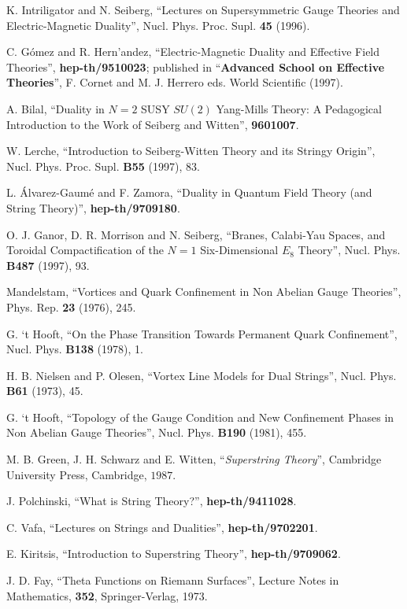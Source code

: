 \begin{thebibliography}{99}
 K. Intriligator and N. Seiberg, ``Lectures 
on Supersymmetric Gauge Theories and Electric-Magnetic Duality'', 
Nucl. Phys. Proc. Supl. {\bf 45} (1996).

 C. G\'omez and R. Hern'andez, ``Electric-Magnetic Duality 
and Effective Field Theories'', {\bf hep-th/9510023}; published
in ``{\bf Advanced School on Effective Theories}'', F. Cornet and M.
J. Herrero eds. World Scientific (1997).
  
A. Bilal, ``Duality in $N=2$ SUSY $SU(2)$ 
Yang-Mills Theory: A Pedagogical Introduction to the 
Work of Seiberg and Witten'', {\bf 9601007}.
  
W. Lerche, ``Introduction to Seiberg-Witten Theory and its Stringy
Origin'', Nucl. Phys. Proc. Supl. {\bf B55} (1997), 83.
  

L. \'Alvarez-Gaum\'e and F. Zamora, ``Duality in Quantum Field
Theory (and String Theory)'', {\bf hep-th/9709180}.

 O. J. Ganor, D. R. Morrison and N. Seiberg,
``Branes, Calabi-Yau Spaces, and Toroidal Compactification of the
$N=1$ Six-Dimensional $E_8$ Theory'', Nucl. Phys. {\bf B487}
(1997), 93.

 Mandelstam, ``Vortices and Quark Confinement 
in Non Abelian Gauge Theories'', Phys. Rep. {\bf 23} (1976), 245.

 G. `t Hooft, ``On the Phase Transition 
Towards Permanent Quark Confinement'', Nucl. Phys. {\bf B138} (1978), 1.

 H. B. Nielsen and P. Olesen, ``Vortex Line Models for 
Dual Strings'', Nucl. Phys. {\bf B61} (1973),
45.

 G. `t Hooft, ``Topology of the Gauge Condition and
New Confinement Phases in Non Abelian Gauge Theories'', Nucl. Phys. {\bf B190}
(1981), 455.

 M. B. Green, J. H. Schwarz and E. Witten,
``{\em Superstring Theory}'', Cambridge University Press,
Cambridge, $1987$.

 J. Polchinski, ``What is String Theory?'',
{\bf hep-th/9411028}.

 C. Vafa, ``Lectures on Strings and Dualities'',
{\bf hep-th/9702201}.

 E. Kiritsis, ``Introduction to Superstring Theory'', {\bf hep-th/9709062}.

 J. D. Fay, ``Theta Functions on Riemann Surfaces'', Lecture Notes 
in Mathematics, {\bf 352}, Springer-Verlag, 1973.


\end{thebibliography}
